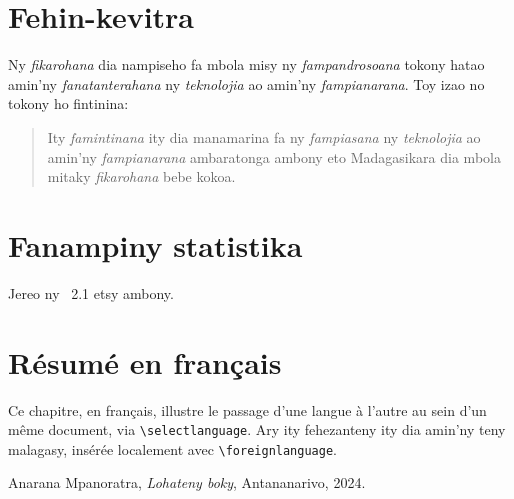 \documentclass[12pt]{report}
\begin{document}
\chapter{Fehin-kevitra}

Ny \emph{fikarohana} dia nampiseho fa mbola misy ny
\emph{fampandrosoana} tokony hatao amin'ny \emph{fanatanterahana}
ny \emph{teknolojia} ao amin'ny \emph{fampianarana}. Toy izao no
tokony ho fintinina:

\begin{abstract}
Ity \emph{famintinana} ity dia manamarina fa ny
\emph{fampiasana} ny \emph{teknolojia} ao amin'ny
\emph{fampianarana} ambaratonga ambony eto Madagasikara dia
mbola mitaky \emph{fikarohana} bebe kokoa.
\end{abstract}

\appendix
\chapter{Fanampiny statistika}

Jereo ny \tablename~2.1 etsy ambony.

\chapter*{Résumé en français}

Ce chapitre, en français, illustre le passage d'une langue à
l'autre au sein d'un même document, via
\texttt{\textbackslash selectlanguage}. \foreignlanguage{malagasy}{Ary
ity fehezanteny ity dia amin'ny teny malagasy}, insérée localement
avec \texttt{\textbackslash foreignlanguage}.


\begin{thebibliography}{9}
 Anarana Mpanoratra, \emph{Lohateny boky},
  Antananarivo, 2024.
\end{thebibliography}
\end{document}
